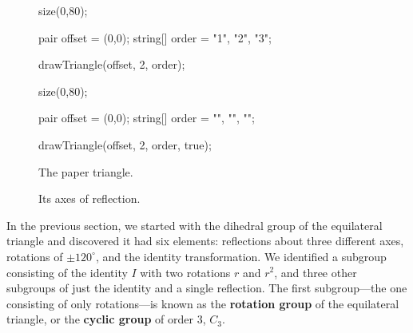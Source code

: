 \documentclass[../gatm.tex]{subfiles}
\begin{document}
\begin{figure}[h]
	\begin{center}
		\begin{minipage}[b]{0.45\textwidth}
			\centering
			\begin{asy}[width=0.5\textwidth]
				size(0,80);
				
				pair offset = (0,0);
				string[] order = {"1", "2", "3"};
				
				drawTriangle(offset, 2, order);
			\end{asy}
		\end{minipage}
		\hfill
		\begin{minipage}[b]{0.45\textwidth}
			\centering
			\begin{asy}[width=0.7\textwidth]
				size(0,80);
				
				pair offset = (0,0);
				string[] order = {"", "", ""};
				
				drawTriangle(offset, 2, order, true);
			\end{asy}
		\end{minipage}
	\end{center}
	\vspace*{-2\baselineskip}
	\begin{center}
		\begin{minipage}[t]{0.45\textwidth}
			\caption{The paper triangle.}
			\label{fig:paper_triangle}
		\end{minipage}
		\hfill
		\begin{minipage}[t]{0.45\textwidth}
			\caption{Its axes of reflection.}
			\label{fig:triangle_reflections}
		\end{minipage}
	\end{center}
\end{figure}

\noindent In the previous section, we started with the dihedral group of the equilateral triangle and discovered it had six elements: reflections about three different axes, rotations of $\pm 120^{\circ}$, and the identity transformation. We identified a subgroup consisting of the identity $I$ with two rotations $r$ and $r^2$, and three other subgroups of just the identity and a single reflection. The first subgroup---the one consisting of only rotations---is known as the \textbf{rotation group} of the equilateral triangle, or the \textbf{cyclic group} of order $3$, $C_3$.
\end{document}
